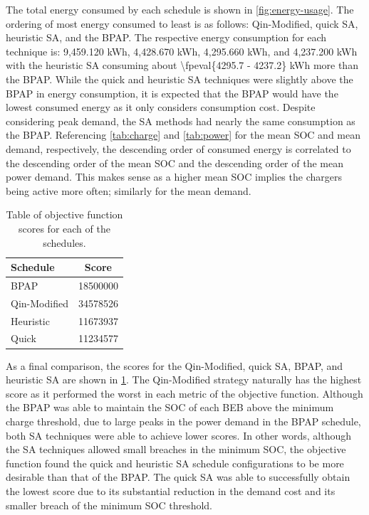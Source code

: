 \documentclass[ee,thesis]{usuthesis}
\begin{document}
The total energy consumed by each schedule is shown in \ref{fig:energy-usage}. The ordering of most energy consumed to
least is as follows: Qin-Modified, quick SA, heuristic SA, and the BPAP. The respective energy consumption for each
technique is: 9,459.120 kWh, 4,428.670 kWh, 4,295.660 kWh, and 4,237.200 kWh with the heuristic SA consuming about
\num{\fpeval{4295.7 - 4237.2}} kWh more than the BPAP. While the quick and heuristic SA techniques were
slightly above the BPAP in energy consumption, it is expected that the BPAP would have the lowest consumed energy as it
only considers consumption cost. Despite considering peak demand, the SA methods had nearly the same consumption as the
BPAP. Referencing \ref{tab:charge} and \ref{tab:power} for the mean SOC and mean demand, respectively, the descending order of
consumed energy is correlated to the descending order of the mean SOC and the descending order of the mean power demand.
This makes sense as a higher mean SOC implies the chargers being active more often; similarly for the mean demand.

\begin{table}[htbp]
\caption{\label{tab:scores}Table of objective function scores for each of the schedules.}
\centering
\begin{tabular}{l|c}
\hline
Schedule & Score\\[0pt]
\hline
BPAP & \num{18500000}\\[0pt]
Qin-Modified & \num{34578526}\\[0pt]
Heuristic & \num{11673937}\\[0pt]
Quick & \num{11234577}\\[0pt]
\hline
\end{tabular}
\end{table}

As a final comparison, the scores for the Qin-Modified, quick SA, BPAP, and heuristic SA are shown in \ref{tab:scores}. The
Qin-Modified strategy naturally has the highest score as it performed the worst in each metric of the objective
function. Although the BPAP was able to maintain the SOC of each BEB above the minimum charge threshold, due to large
peaks in the power demand in the BPAP schedule, both SA techniques were able to achieve lower scores. In other words,
although the SA techniques allowed small breaches in the minimum SOC, the objective function found the quick and
heuristic SA schedule configurations to be more desirable than that of the BPAP. The quick SA was able to successfully
obtain the lowest score due to its substantial reduction in the demand cost and its smaller breach of the minimum SOC
threshold.
\end{document}
